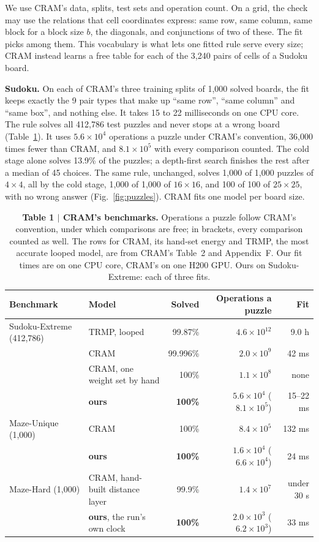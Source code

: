 \documentclass[10pt]{article}
\newcommand{\figlabel}[2]{\textbf{#1 $|$ #2}}
\begin{document}
We use CRAM's data, splits, test sets and operation count\cite{hoover2026classical}. On a grid, the check may use the
relations that cell coordinates express: same row, same column, same block for a block size $b$, the diagonals, and
conjunctions of two of these. The fit picks among them. This vocabulary is what lets one fitted rule serve every size;
CRAM instead learns a free table for each of the 3,240 pairs of cells of a Sudoku board.

\textbf{Sudoku.} On each of CRAM's three training splits of 1,000 solved boards, the fit
keeps exactly the 9 pair types that make up ``same row'', ``same column'' and ``same box'', and nothing
else. It takes 15 to 22 milliseconds on one CPU core. The rule solves all
412,786 test puzzles and never stops at a wrong board (Table~\ref{tab:cram}). It uses $5.6\times10^{4}$
operations a puzzle under CRAM's convention, 36,000 times fewer than CRAM, and $8.1\times10^{5}$ with
every comparison counted. The cold stage alone solves 13.9\% of the puzzles; a depth-first search
finishes the rest after a median of 45 choices. The same rule, unchanged, solves
1,000 of 1,000 puzzles of $4\times4$, all by the cold stage, 1,000 of 1,000 of
$16\times16$, and 100 of 100 of $25\times25$, with no wrong answer (Fig.~\ref{fig:puzzles}).
CRAM fits one model per board size.

\begin{table}[tbp]\centering\small
\caption{\figlabel{Table 1}{CRAM's benchmarks.} Operations a puzzle follow CRAM's convention, under which comparisons
are free; in brackets, every comparison counted as well. The rows for CRAM, its hand-set energy and TRMP, the most
accurate looped model, are from CRAM's Table~2 and Appendix~F\cite{hoover2026classical}. Our fit times are on one CPU
core, CRAM's on one H200 GPU. Ours on Sudoku-Extreme: each of three fits.}\label{tab:cram}
\begin{tabular}{llrrr}\toprule
Benchmark & Model & Solved & Operations a puzzle & Fit \\\midrule
Sudoku-Extreme (412,786) & TRMP, looped & 99.87\% & $4.6\times10^{12}$ & 9.0 h \\
 & CRAM & 99.996\% & $2.0\times10^{9}$ & 42 ms \\
 & CRAM, one weight set by hand & 100\% & $1.1\times10^{8}$ & none \\
 & \textbf{ours} & \textbf{100\%} & $5.6\times10^{4}$ ($8.1\times10^{5}$) & 15--22 ms \\\midrule
Maze-Unique (1,000) & CRAM & 100\% & $8.4\times10^{5}$ & 132 ms \\
 & \textbf{ours} & \textbf{100\%} & $1.6\times10^{4}$ ($6.6\times10^{4}$) & 24 ms \\\midrule
Maze-Hard (1,000) & CRAM, hand-built distance layer & 99.9\% & $1.4\times10^{7}$ & under 30 s \\
 & \textbf{ours}, the run's own clock & \textbf{100\%} & $2.0\times10^{3}$ ($6.2\times10^{3}$) & 33 ms \\\bottomrule
\end{tabular}
\end{table}
\end{document}

